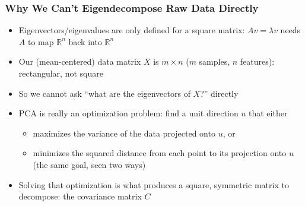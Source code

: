\begin{frame}[fragile] \frametitle{Why We Can't Eigendecompose Raw Data Directly}
\begin{itemize}
\item Eigenvectors/eigenvalues are only defined for a square matrix: $Av=\lambda v$ needs $A$ to map $\mathbb{R}^n$ back into $\mathbb{R}^n$
\item Our (mean-centered) data matrix $X$ is $m \times n$ ($m$ samples, $n$ features): rectangular, not square
\item So we cannot ask ``what are the eigenvectors of $X$?'' directly
\item PCA is really an optimization problem: find a unit direction $u$ that either
\begin{itemize}
\item maximizes the variance of the data projected onto $u$, or
\item minimizes the squared distance from each point to its projection onto $u$ (the same goal, seen two ways)
\end{itemize}
\item Solving that optimization is what produces a square, symmetric matrix to decompose: the covariance matrix $C$
\end{itemize}
\end{frame}

